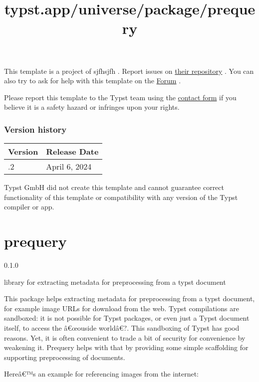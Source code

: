 This template is a project of sjfhsjfh . Report issues on
\href{https://github.com/sjfhsjfh/unilab}{their repository} . You can
also try to ask for help with this template on the
\href{https://forum.typst.app}{Forum} .

Please report this template to the Typst team using the
\href{https://typst.app/contact}{contact form} if you believe it is a
safety hazard or infringes upon your rights.

\label{versions}
\subsubsection{Version history}\label{version-history}

\begin{longtable}[]{@{}ll@{}}
\toprule\noalign{}
Version & Release Date \\
\midrule\noalign{}
\endhead
\bottomrule\noalign{}
\endlastfoot
0.0.2 & April 6, 2024 \\
\end{longtable}

Typst GmbH did not create this template and cannot guarantee correct
functionality of this template or compatibility with any version of the
Typst compiler or app.


\title{typst.app/universe/package/prequery}

\label{banner}
\section{prequery}\label{prequery}

{ 0.1.0 }

library for extracting metadata for preprocessing from a typst document

\label{readme}
This package helps extracting metadata for preprocessing from a typst
document, for example image URLs for download from the web. Typst
compilations are sandboxed: it is not possible for Typst packages, or
even just a Typst document itself, to access the â€œouside worldâ€?.
This sandboxing of Typst has good reasons. Yet, it is often convenient
to trade a bit of security for convenience by weakening it. Prequery
helps with that by providing some simple scaffolding for supporting
preprocessing of documents.

Hereâ€™s an example for referencing images from the internet:

\begin{Shaded}
\begin{Highlighting}[]


\end{Highlighting}
\end{Shaded}

